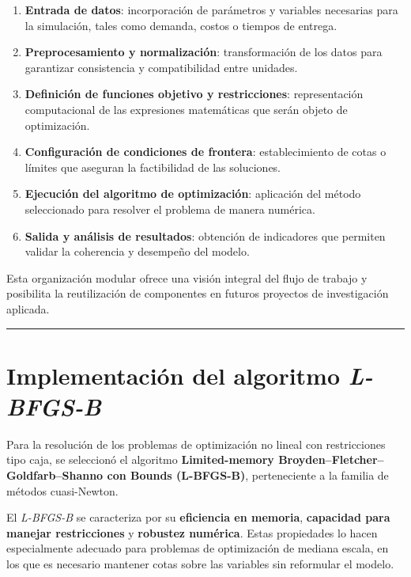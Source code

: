 \documentclass[
  spanish,
  us-letterpaper,
  DIV=11,
  numbers=noendperiod]{scrreprt}
\providecommand{\tightlist}{%
  \setlength{\itemsep}{0pt}\setlength{\parskip}{0pt}}
\numberwithin{equation}{section}
\begin{document}
\begin{enumerate}
\def\labelenumi{\arabic{enumi}.}
\tightlist
\item
  \textbf{Entrada de datos}: incorporación de parámetros y variables
  necesarias para la simulación, tales como demanda, costos o tiempos de
  entrega.\\
\item
  \textbf{Preprocesamiento y normalización}: transformación de los datos
  para garantizar consistencia y compatibilidad entre unidades.\\
\item
  \textbf{Definición de funciones objetivo y restricciones}:
  representación computacional de las expresiones matemáticas que serán
  objeto de optimización.\\
\item
  \textbf{Configuración de condiciones de frontera}: establecimiento de
  cotas o límites que aseguran la factibilidad de las soluciones.\\
\item
  \textbf{Ejecución del algoritmo de optimización}: aplicación del
  método seleccionado para resolver el problema de manera numérica.\\
\item
  \textbf{Salida y análisis de resultados}: obtención de indicadores que
  permiten validar la coherencia y desempeño del modelo.
\end{enumerate}

Esta organización modular ofrece una visión integral del flujo de
trabajo y posibilita la reutilización de componentes en futuros
proyectos de investigación aplicada.

\begin{center}\rule{0.5\linewidth}{0.5pt}\end{center}

\section{\texorpdfstring{Implementación del algoritmo
\emph{L-BFGS-B}}{Implementación del algoritmo L-BFGS-B}}\label{implementaciuxf3n-del-algoritmo-l-bfgs-b}

Para la resolución de los problemas de optimización no lineal con
restricciones tipo caja, se seleccionó el algoritmo
\textbf{Limited-memory Broyden--Fletcher--Goldfarb--Shanno con Bounds
(L-BFGS-B)}, perteneciente a la familia de métodos cuasi-Newton.

El \emph{L-BFGS-B} se caracteriza por su \textbf{eficiencia en memoria},
\textbf{capacidad para manejar restricciones} y \textbf{robustez
numérica}. Estas propiedades lo hacen especialmente adecuado para
problemas de optimización de mediana escala, en los que es necesario
mantener cotas sobre las variables sin reformular el modelo.
\end{document}
